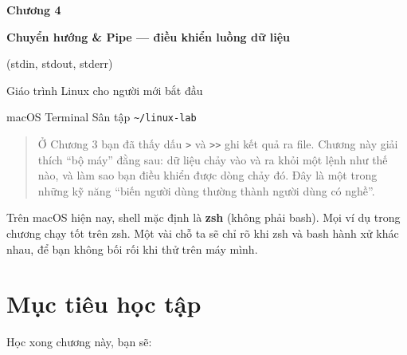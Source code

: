 \documentclass[12pt,a4paper]{article}
\newcommand{\cmd}[1]{\texttt{#1}}
\begin{document}
\begin{titlepage}
\centering
\vspace*{3cm}
{\Huge\bfseries\color{seniorblue} Chương 4\par}
\vspace{1cm}
{\LARGE\bfseries Chuyển hướng \& Pipe --- điều khiển luồng dữ liệu\par}
\vspace{0.5cm}
{\large (stdin, stdout, stderr)\par}
\vspace{2cm}
{\large Giáo trình Linux cho người mới bắt đầu\par}
\vfill
{\large macOS \textbullet{} Terminal \textbullet{} Sân tập \cmd{\textasciitilde/linux-lab}\par}
\vspace{1cm}
\end{titlepage}

\tableofcontents
\newpage

\begin{quote}
Ở Chương 3 bạn đã thấy dấu \cmd{>} và \cmd{>>} ghi kết quả ra file. Chương này giải thích ``bộ máy'' đằng sau: dữ liệu chảy vào và ra khỏi một lệnh như thế nào, và làm sao bạn điều khiển được dòng chảy đó. Đây là một trong những kỹ năng ``biến người dùng thường thành người dùng có nghề''.
\end{quote}

\begin{notebox}[title={Lưu ý môi trường}]
Trên macOS hiện nay, shell mặc định là \textbf{zsh} (không phải bash). Mọi ví dụ trong chương chạy tốt trên zsh. Một vài chỗ ta sẽ chỉ rõ khi zsh và bash hành xử khác nhau, để bạn không bối rối khi thử trên máy mình.
\end{notebox}

\section{Mục tiêu học tập}

Học xong chương này, bạn sẽ:
\end{document}
